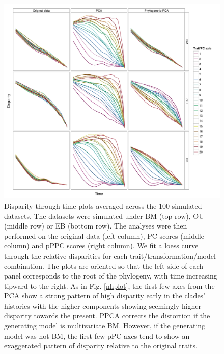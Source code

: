 \documentclass[a4paper,12pt]{article}
\begin{document}
\begin{figure}[p]
\centering
\includegraphics[scale=0.65]{./fig/dtt-3models.pdf}
\caption{Disparity through time plots averaged across the 100 simulated datasets. The datasets were simulated under BM (top row), OU (middle row) or EB (bottom row). The analyses were then performed on the original data (left column), PC scores (middle column) and pPPC scores (right column). We fit a loess curve through the relative disparities for each trait/transformation/model combination. The plots are oriented so that the left side of each panel corresponds to the root of the phylogeny, with time increasing tipward to the right. As in Fig. \ref{nhplot}, the first few axes from the PCA show a strong pattern of high disparity early in the clades' histories with the higher components showing seemingly higher disparity towards the present. PPCA corrects the distortion if the generating model is multivariate BM. However, if the generating model was not BM, the first few pPC axes tend to show an exaggerated pattern of disparity relative to the original traits.}
\label{dttplot}
\end{figure}

\renewcommand\thefigure{S\arabic{figure}}
\renewcommand\thetable{S \arabic{table}}
\setcounter{figure}{0}    
\setcounter{table}{0}
\end{document}
